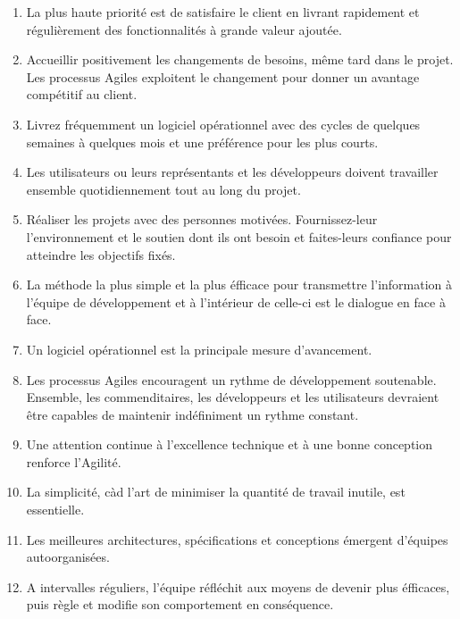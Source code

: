 \documentclass{report}
\begin{document}
		\begin{enumerate}
			\item La plus haute priorité est de satisfaire le client en livrant rapidement et régulièrement des fonctionnalités à grande valeur ajoutée.\\
			\item Accueillir positivement les changements de besoins, même tard dans le projet. Les processus Agiles exploitent le changement pour donner un avantage compétitif au client.\\
			\item Livrez fréquemment un logiciel opérationnel avec des cycles de quelques semaines à quelques mois et une préférence pour les plus courts.\\
			\item Les utilisateurs ou leurs représentants et les développeurs doivent travailler ensemble quotidiennement tout au long du projet.\\
			\item Réaliser les projets avec des personnes motivées. Fournissez-leur l'environnement et le soutien dont ils ont besoin et faites-leurs confiance pour atteindre les objectifs fixés.\\
			\item La méthode la plus simple et la plus éfficace pour transmettre l'information à l'équipe de développement et à l'intérieur de celle-ci est le dialogue en face à face.\\
			\item Un logiciel opérationnel est la principale mesure d'avancement.\\
			\item Les processus Agiles encouragent un rythme de développement soutenable. Ensemble, les commenditaires, les développeurs et les utilisateurs devraient être capables de maintenir indéfiniment un rythme constant.
			\item Une attention continue à l'excellence technique et à une bonne conception renforce l'Agilité.\\
			\item La simplicité, càd l'art de minimiser la quantité de travail inutile, est essentielle.\\
			\item Les meilleures architectures, spécifications et conceptions émergent d'équipes autoorganisées.\\
			\item A intervalles réguliers, l'équipe réfléchit aux moyens de devenir plus éfficaces, puis règle et modifie son comportement en conséquence.\\
		\end{enumerate}
\end{document}
